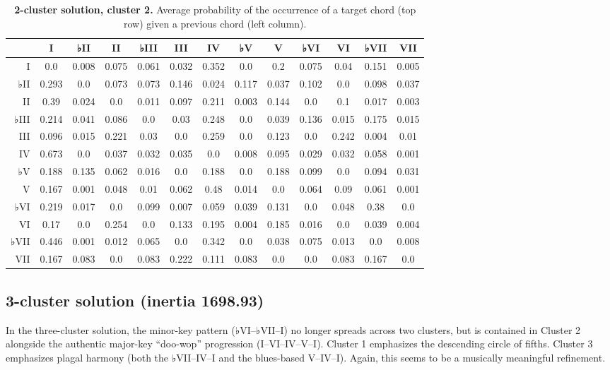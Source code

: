 \begin{table}[htbp]
\begin{minipage}{\linewidth}
\setlength{\tymax}{0.5\linewidth}
\centering
\small
\caption{\textbf{2-cluster solution, cluster 2.} Average probability of the occurrence of a target chord (top row) given a previous chord (left column).}
\label{2-clustersolutioncluster2.averageprobabilityoftheoccurrenceofatargetchordtoprowgivenapreviouschordleftcolumn.}
\begin{tabulary}{\textwidth}{@{}RCCCCCCCCCCCC@{}} \toprule
&I&♭II&II&♭III&III&IV&♭V&V&♭VI&VI&♭VII&VII\\
\midrule
I&0.0&0.008&0.075&0.061&0.032&0.352&0.0&0.2&0.075&0.04&0.151&0.005\\
♭II&0.293&0.0&0.073&0.073&0.146&0.024&0.117&0.037&0.102&0.0&0.098&0.037\\
II&0.39&0.024&0.0&0.011&0.097&0.211&0.003&0.144&0.0&0.1&0.017&0.003\\
♭III&0.214&0.041&0.086&0.0&0.03&0.248&0.0&0.039&0.136&0.015&0.175&0.015\\
III&0.096&0.015&0.221&0.03&0.0&0.259&0.0&0.123&0.0&0.242&0.004&0.01\\
IV&0.673&0.0&0.037&0.032&0.035&0.0&0.008&0.095&0.029&0.032&0.058&0.001\\
♭V&0.188&0.135&0.062&0.016&0.0&0.188&0.0&0.188&0.099&0.0&0.094&0.031\\
V&0.167&0.001&0.048&0.01&0.062&0.48&0.014&0.0&0.064&0.09&0.061&0.001\\
♭VI&0.219&0.017&0.0&0.099&0.007&0.059&0.039&0.131&0.0&0.048&0.38&0.0\\
VI&0.17&0.0&0.254&0.0&0.133&0.195&0.004&0.185&0.016&0.0&0.039&0.004\\
♭VII&0.446&0.001&0.012&0.065&0.0&0.342&0.0&0.038&0.075&0.013&0.0&0.008\\
VII&0.167&0.083&0.0&0.083&0.222&0.111&0.083&0.0&0.0&0.083&0.167&0.0\\

\bottomrule

\end{tabulary}
\end{minipage}
\end{table}

\subsection{3-cluster solution (inertia 1698.93)}
\label{3-clustersolutioninertia1698.93}

In the three-cluster solution, the minor-key pattern (♭VI–♭VII–I) no longer spreads across two clusters, but is contained in Cluster 2 alongside the authentic major-key ``doo-wop'' progression (I–VI–IV–V–I). Cluster 1 emphasizes the descending circle of fifths. Cluster 3 emphasizes plagal harmony (both the ♭VII–IV–I and the blues-based V–IV–I). Again, this seems to be a musically meaningful refinement.

